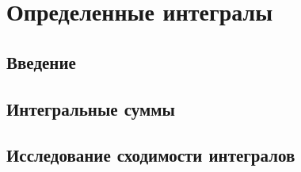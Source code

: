 \documentclass[main]{subfiles}
\begin{document}
    \section{Определенные интегралы}
    \subsection{Введение}

    \subsection{Интегральные суммы}

    \subsection{Исследование сходимости интегралов}
    
\end{document}
